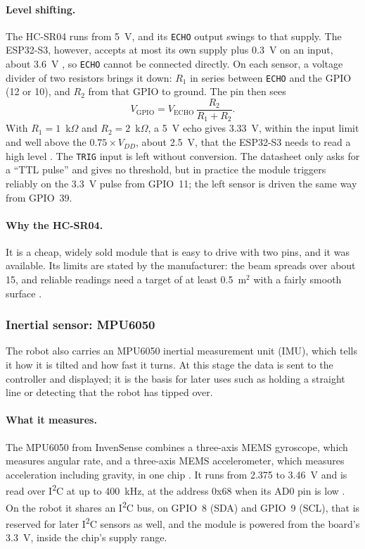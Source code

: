 \paragraph{Level shifting.} The HC-SR04 runs from 5~V, and its \texttt{ECHO} output
swings to that supply. The ESP32-S3, however, accepts at most its own supply plus
0.3~V on an input, about 3.6~V \cite{esp32s3_datasheet}, so \texttt{ECHO} cannot be
connected directly. On each sensor, a voltage divider of two resistors brings it down:
\(R_1\) in series between \texttt{ECHO} and the GPIO (12 or 10), and \(R_2\) from that
GPIO to ground. The pin then sees
\begin{equation}
  V_{\text{GPIO}} = V_{\text{ECHO}} \, \frac{R_2}{R_1 + R_2}.
\end{equation}
With \(R_1 = 1\)~k\(\Omega\) and \(R_2 = 2\)~k\(\Omega\), a 5~V echo gives 3.33~V,
within the input limit and well above the \(0.75 \times V_{DD}\), about 2.5~V, that the
ESP32-S3 needs to read a high level \cite{esp32s3_datasheet}. The \texttt{TRIG} input is
left without conversion. The datasheet only asks for a ``TTL pulse''
\cite{hcsr04_datasheet} and gives no threshold, but in practice the module triggers
reliably on the 3.3~V pulse from GPIO~11; the left sensor is driven the same way from
GPIO~39.

\paragraph{Why the HC-SR04.} It is a cheap, widely sold module that is easy to drive
with two pins, and it was available. Its limits are stated by the manufacturer: the beam
spreads over about 15\textdegree, and reliable readings need a target of at least
0.5~m\(^2\) with a fairly smooth surface \cite{hcsr04_datasheet}.

\subsubsection{Inertial sensor: MPU6050}
\label{sec:mpu6050}
The robot also carries an MPU6050 inertial measurement unit (IMU), which tells it how it
is tilted and how fast it turns. At this stage the data is sent to the controller and
displayed; it is the basis for later uses such as holding a straight line or detecting
that the robot has tipped over.

\paragraph{What it measures.} The MPU6050 from InvenSense combines a three-axis MEMS
gyroscope, which measures angular rate, and a three-axis MEMS accelerometer, which
measures acceleration including gravity, in one chip \cite{mpu6000_ps}. It runs from
2.375 to 3.46~V and is read over I\textsuperscript{2}C at up to 400~kHz, at the address
0x68 when its AD0 pin is low \cite{mpu6000_ps}. On the robot it shares an
I\textsuperscript{2}C bus, on GPIO~8 (SDA) and GPIO~9 (SCL), that is reserved for later
I\textsuperscript{2}C sensors as well, and the module is powered from the board's 3.3~V,
inside the chip's supply range.

